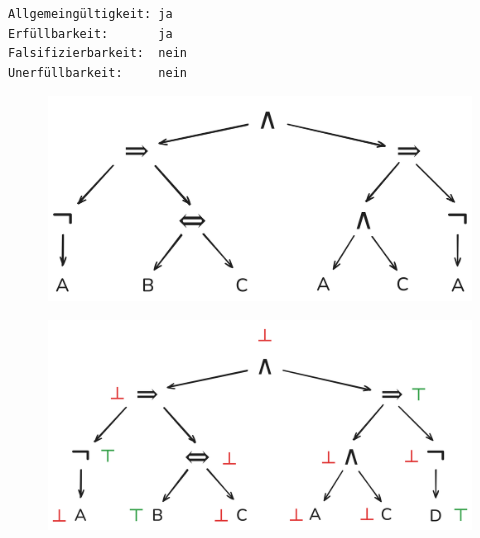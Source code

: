 \documentclass[10pt, oneside]{article}
\begin{document}
\begin{enumerate}[(a)]
        \verb|Allgemeingültigkeit: ja| \\
        \verb|Erfüllbarkeit:       ja| \\
        \verb|Falsifizierbarkeit:  nein| \\
        \verb|Unerfüllbarkeit:     nein|
\end{enumerate}

\begin{figure}[p]
    \centering
    \includegraphics[width=1\textwidth]{./assets/ha.01.2.a.1.png}
    \caption{}
    \label{fig:ha.01.2.a.1}
\end{figure}

\begin{figure}[p]
    \centering
    \includegraphics[width=1\textwidth]{./assets/ha.01.2.a.2.png}
    \caption{}
    \label{fig:ha.01.2.a.2}
\end{figure}
\end{document}

